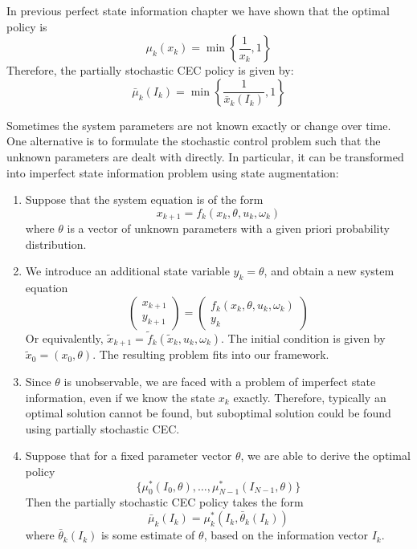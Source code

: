 \begin{example}[Aloha]
In previous perfect state information chapter we have shown that the optimal policy is
\[
\mu_k(x_k)=\min\left\{\frac{1}{x_k},1\right\}
\]
Therefore, the partially stochastic CEC policy is given by:
\[
\bar{\mu}_k(I_k)=\min\left\{
\frac{1}{\bar{x}_k(I_k)},1
\right\}
\]

\end{example}
\begin{example}\label{exp:5:2}
Sometimes the system parameters are not known exactly or change over time.
One alternative is to formulate the stochastic control problem such that the unknown parameters are dealt with directly.
In particular, it can be transformed into imperfect state information problem using state augmentation:
\begin{enumerate}
\item
Suppose that the system equation is of the form
\[
x_{k+1}=f_k(x_k,\theta,u_k,\omega_k)
\]
where $\theta$ is a vector of unknown parameters with a given priori probability distribution.
\item
We introduce an additional state variable $y_k=\theta$, and obtain a new system equation
\[
\begin{pmatrix}
x_{k+1}\\y_{k+1}
\end{pmatrix}
=
\begin{pmatrix}
f_k(x_k,\theta,u_k,\omega_k)
\\
y_k
\end{pmatrix}
\]
Or equivalently, $\tilde{x}_{k+1}=\tilde{f}_k(\tilde{x}_k,u_k,\omega_k)$.
The initial condition is given by $\tilde{x}_0=(x_0,\theta)$.
The resulting problem fits into our framework.
\item
Since $\theta$ is unobservable, we are faced with a problem of imperfect state information, even if we know the state $x_k$ exactly.
Therefore, typically an optimal solution cannot be found, but suboptimal solution could be found using partially stochastic CEC.
\item
Suppose that for a fixed parameter vector $\theta$, we are able to derive the optimal policy
\[
\{\mu_0^*(I_0,\theta),\dots,\mu_{N-1}^*(I_{N-1},\theta)\}
\]
Then the partially stochastic CEC policy takes the form
\[
\bar{\mu}_k(I_k) = \mu^*_k(I_k,\bar{\theta}_k(I_k))
\]
where $\bar{\theta}_k(I_k)$ is some estimate of $\theta$, based on the information vector $I_k$.


\end{enumerate}
\end{example}


